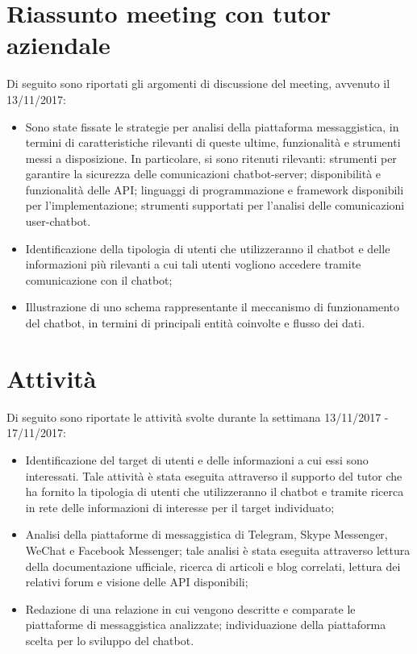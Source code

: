 \documentclass[11pt,notitlepage]{article}
\begin{document}
\section*{Riassunto meeting con tutor aziendale}
Di seguito sono riportati gli argomenti di discussione del meeting, avvenuto il 13/11/2017:
\begin{itemize}
		\item Sono state fissate le strategie per analisi della piattaforma messaggistica, in termini di caratteristiche rilevanti di queste ultime, funzionalità e strumenti messi a disposizione. In particolare, si sono ritenuti rilevanti: strumenti per garantire la sicurezza delle comunicazioni chatbot-server; disponibilità e funzionalità delle API; linguaggi di programmazione e framework disponibili per l'implementazione; strumenti supportati per l'analisi delle comunicazioni user-chatbot.
		\item Identificazione della tipologia di utenti che utilizzeranno il chatbot e delle informazioni più rilevanti a cui tali utenti vogliono accedere tramite comunicazione con il chatbot; 
		\item Illustrazione di uno schema rappresentante il meccanismo di funzionamento del chatbot, in termini di principali entità coinvolte e flusso dei dati.
\end{itemize} 




\bigskip
\section*{Attività}
Di seguito sono riportate le attività svolte durante la settimana 13/11/2017 - 17/11/2017:
\begin{itemize}
		\item Identificazione del target di utenti e delle informazioni a cui essi sono interessati. Tale attività è stata eseguita attraverso il supporto del tutor che ha fornito la tipologia di utenti che utilizzeranno il chatbot e tramite ricerca in rete delle informazioni di interesse per il target individuato;
		\item Analisi della piattaforme di messaggistica di Telegram, Skype Messenger, WeChat e Facebook Messenger; tale analisi è stata eseguita attraverso lettura della documentazione ufficiale, ricerca di articoli e blog correlati, lettura dei relativi forum e visione delle API disponibili;
		\item Redazione di una relazione in cui vengono descritte e comparate le piattaforme di messaggistica analizzate; individuazione della piattaforma scelta per lo sviluppo del chatbot. 
\end{itemize}
\end{document}

